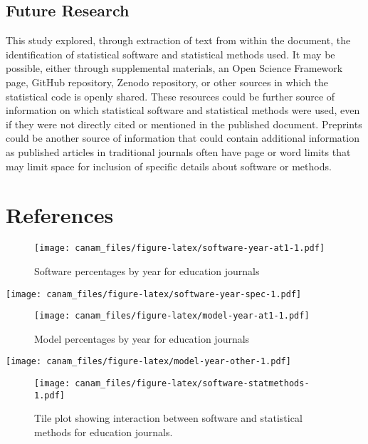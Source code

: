 \documentclass[
  english,
  ,man]{apa6}
\begin{document}
\hypertarget{future-research}{%
\subsection{Future Research}\label{future-research}}

This study explored, through extraction of text from within the document, the identification of statistical software and statistical methods used. It may be possible, either through supplemental materials, an Open Science Framework page, GitHub repository, Zenodo repository, or other sources in which the statistical code is openly shared. These resources could be further source of information on which statistical software and statistical methods were used, even if they were not directly cited or mentioned in the published document. Preprints could be another source of information that could contain additional information as published articles in traditional journals often have page or word limits that may limit space for inclusion of specific details about software or methods.

\newpage

\hypertarget{references}{%
\section{References}\label{references}}

\setlength{\parindent}{-0.5in}
\setlength{\leftskip}{0.5in}

\begin{figure}
\centering
\texttt{[image: canam\_files/figure-latex/software-year-at1-1.pdf]}
\caption{\label{fig:software-year-at1}Software percentages by year for education journals}
\end{figure}

\texttt{[image: canam\_files/figure-latex/software-year-spec-1.pdf]}

\begin{figure}
\centering
\texttt{[image: canam\_files/figure-latex/model-year-at1-1.pdf]}
\caption{\label{fig:model-year-at1}Model percentages by year for education journals}
\end{figure}

\texttt{[image: canam\_files/figure-latex/model-year-other-1.pdf]}

\begin{figure}
\centering
\texttt{[image: canam\_files/figure-latex/software-statmethods-1.pdf]}
\caption{\label{fig:software-statmethods}Tile plot showing interaction between software and statistical methods for education journals.}
\end{figure}
\end{document}

